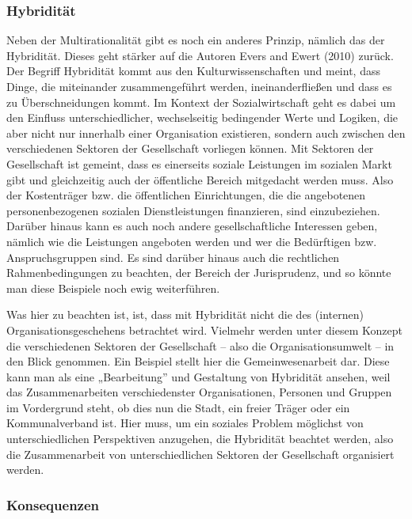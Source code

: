 \documentclass[
  letterpaper,
]{book}
\begin{document}
\subsubsection{Hybridität}\label{sozialwirtschat-hybriditaet}

Neben der Multirationalität gibt es noch ein anderes Prinzip, nämlich
das der Hybridität. Dieses geht stärker auf die Autoren Evers and Ewert
(2010) zurück. Der Begriff Hybridität kommt aus den Kulturwissenschaften
und meint, dass Dinge, die miteinander zusammengeführt werden,
ineinanderfließen und dass es zu Überschneidungen kommt. Im Kontext der
Sozialwirtschaft geht es dabei um den Einfluss unterschiedlicher,
wechselseitig bedingender Werte und Logiken, die aber nicht nur
innerhalb einer Organisation existieren, sondern auch zwischen den
verschiedenen Sektoren der Gesellschaft vorliegen können. Mit Sektoren
der Gesellschaft ist gemeint, dass es einerseits soziale Leistungen im
sozialen Markt gibt und gleichzeitig auch der öffentliche Bereich
mitgedacht werden muss. Also der Kostenträger bzw. die öffentlichen
Einrichtungen, die die angebotenen personenbezogenen sozialen
Dienstleistungen finanzieren, sind einzubeziehen. Darüber hinaus kann es
auch noch andere gesellschaftliche Interessen geben, nämlich wie die
Leistungen angeboten werden und wer die Bedürftigen bzw.
Anspruchsgruppen sind. Es sind darüber hinaus auch die rechtlichen
Rahmenbedingungen zu beachten, der Bereich der Jurisprudenz, und so
könnte man diese Beispiele noch ewig weiterführen.

Was hier zu beachten ist, ist, dass mit Hybridität nicht die des
(internen) Organisationsgeschehens betrachtet wird. Vielmehr werden
unter diesem Konzept die verschiedenen Sektoren der Gesellschaft -- also
die Organisationsumwelt -- in den Blick genommen. Ein Beispiel stellt
hier die Gemeinwesenarbeit dar. Diese kann man als eine „Bearbeitung''
und Gestaltung von Hybridität ansehen, weil das Zusammenarbeiten
verschiedenster Organisationen, Personen und Gruppen im Vordergrund
steht, ob dies nun die Stadt, ein freier Träger oder ein Kommunalverband
ist. Hier muss, um ein soziales Problem möglichst von unterschiedlichen
Perspektiven anzugehen, die Hybridität beachtet werden, also die
Zusammenarbeit von unterschiedlichen Sektoren der Gesellschaft
organisiert werden.

\subsubsection{Konsequenzen}\label{sozialwirtschat-konsequenzen}
\end{document}
